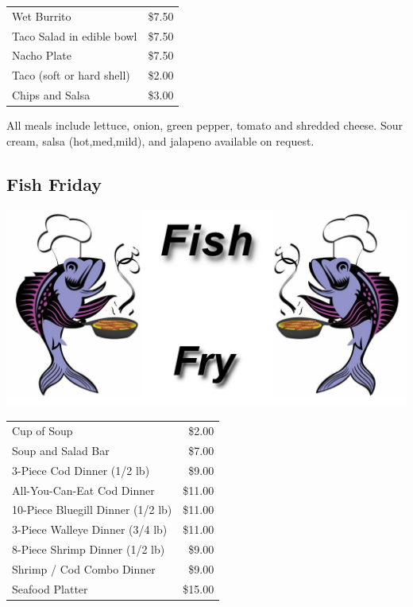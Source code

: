 \documentclass[a0,landscape]{a0poster}
\begin{document}
\begin{multicols}{4}
\vspace{.5cm}

\begin{center}
\begin{tabular}{ l r }
Wet Burrito & \$7.50 \\
Taco Salad in edible bowl & \$7.50 \\
Nacho Plate & \$7.50 \\
Taco (soft or hard shell) & \$2.00 \\
Chips and Salsa & \$3.00 \\
\end{tabular}
\end{center}

\vspace{1cm}

All meals include lettuce, onion, green pepper, tomato and shredded cheese. Sour cream, salsa (hot,med,mild), and jalapeno available on request.


\subsection*{Fish Friday}

\begin{center}
\includegraphics[width=0.8\linewidth]{images/fishfry}
\end{center}

\begin{center}
\begin{tabular}{ l r }
Cup of Soup & \$2.00 \\ 
Soup and Salad Bar & \$7.00 \\
3-Piece Cod Dinner (1/2 lb) & \$9.00 \\
All-You-Can-Eat Cod Dinner & \$11.00 \\
10-Piece Bluegill Dinner (1/2 lb) & \$11.00 \\
3-Piece Walleye Dinner (3/4 lb) & \$11.00 \\
8-Piece Shrimp Dinner (1/2 lb) & \$9.00 \\
Shrimp / Cod Combo Dinner & \$9.00 \\
Seafood Platter & \$15.00 \\
\end{tabular}
\end{center}


\end{multicols}
\end{document}
